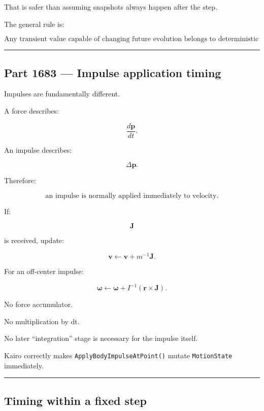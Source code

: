 That is safer than assuming snapshots always happen after the step.

The general rule is:

\[
\boxed{
\text{Any transient value capable of changing future evolution belongs to deterministic state at the instant it is captured.}
}
\]

\begin{center}\rule{0.5\linewidth}{0.5pt}\end{center}

\subsection{Part 1683 --- Impulse application timing}\label{06-engine-ii-ch038-part-1683-impulse-application-timing}

\hypertarget{06-engine-ii-ch038-part-1683-impulse-application-timing}{}

Impulses are fundamentally different.

A force describes:

\[
\frac{d\mathbf p}{dt}.
\]

An impulse describes:

\[
\Delta\mathbf p.
\]

Therefore:

\[
\boxed{
\text{an impulse is normally applied immediately to velocity.}
}
\]

If:

\[
\mathbf J
\]

is received, update:

\[
\mathbf v
\leftarrow
\mathbf v+m^{-1}\mathbf J.
\]

For an off-center impulse:

\[
\boldsymbol\omega
\leftarrow
\boldsymbol\omega+
I^{-1}
(\mathbf r\times\mathbf J).
\]

No force accumulator.

No multiplication by dt.

No later ``integration'' stage is necessary for the impulse itself.

Kairo correctly makes \texttt{ApplyBodyImpulseAtPoint()} mutate \texttt{MotionState} immediately.

\begin{center}\rule{0.5\linewidth}{0.5pt}\end{center}

\subsection{Timing within a fixed step}\label{06-engine-ii-ch038-timing-within-a-fixed-step}

